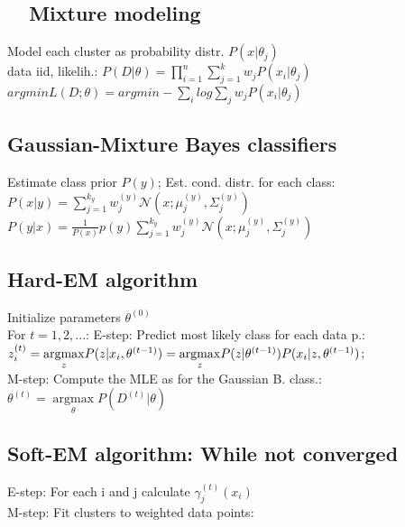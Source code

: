 \subsection*{ ~~Mixture modeling}

Model each cluster as probability distr. $P(x|\theta_j)$\\
data iid, likelih.: $P(D|\theta) = \prod_{i=1}^n \sum_{j=1}^k w_j P(x_i|\theta_j)$\\
$\underset{}{argmin}L(D;\theta) = \underset{}{argmin} - \sum_i log \sum_j w_j P(x_i| \theta_j)$

\subsection*{Gaussian-Mixture Bayes classifiers}
Estimate class prior $P(y)$; Est. cond. distr. for each class:
$P(x|y) = \sum_{j=1}^{k_y} w_j^{(y)} \mathcal{N}(x; \mu_j^{(y)}, \Sigma_j^{(y)})$\\
$P(y|x) = \frac{1}{P(x)} p(y) \sum_{j=1}^{k_y} w_j^{(y)} \mathcal{N}(x; \mu_j^{(y)}, \Sigma_j^{(y)})$

\subsection*{Hard-EM algorithm}
Initialize parameters $\theta^{(0)}$\\
For $t=1,2,...$:
E-step: Predict most likely class for each data p.:
$z_i^{(t)} = \underset{z}{\operatorname{argmax}} P(z|x_i, \theta^{(t-1)})\\
= \underset{z}{\operatorname{argmax}} P(z|\theta^{(t-1)}) P(x_i|z,\theta^{(t-1)})$;\\
M-step: Compute the MLE as for the Gaussian B. class.: $\theta^{(t)} = \underset{\theta}{\operatorname{argmax}} P(D^{(t)}|\theta)$

\subsection*{Soft-EM algorithm: While not converged}
E-step: For each i and j calculate $\gamma_j^{(t)}(x_i)$\\
M-step: Fit clusters to weighted data points:\\

